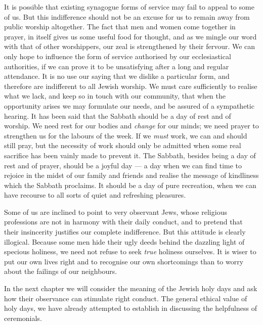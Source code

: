 It is possible that existing synagogue
forms of service may fail to appeal to some
of us. But this indifference should not be
an excuse for us to remain away from public
worship altogether. The fact that men
and women come together in prayer, in
itself gives us some useful food for
thought, and as we mingle our word with
that of other worshippers, our zeal is
strengthened by their fervour. We can
only hope to influence the form of service
authorised by our ecclesiastical authorities,
if we can prove it to be unsatisfying
after a long and regular attendance. It
is no use our saying that we dislike a
particular form, and therefore are indifferent
to all Jewish worship. We must care
sufficiently to realise what we lack, and
keep so in touch with our community,
that when the opportunity arises we may
formulate our needs, and be assured of
a sympathetic hearing. It has been said
that the Sabbath should be a day of rest
and of worship. We need rest for our
bodies and \textsl{change} for our minds; we need
prayer to strengthen us for the labours of
the week. If we \textsl{must} work, we can and
should still pray, but the necessity of work
should only be admitted when some real
sacrifice has been vainly made to prevent
it. The Sabbath, besides being a day of
rest and of prayer, should be a joyful day — 
a day when we can find time to rejoice in
the midst of our family and friends and
realise the message of kindliness which the
Sabbath proclaims. It should be a day of
pure recreation, when we can have
recourse to all sorts of quiet and refreshing
pleasures.

Some of us are inclined to point to very
observant Jews, whose religious professions
are not in harmony with their daily conduct,
and to pretend that their insincerity justifies
our complete indifference. But this attitude
is clearly illogical. Because some men hide
their ugly deeds behind the dazzling light
of specious holiness, we need not refuse to
seek \textsl{true} holiness ourselves. It is wiser
to put our own lives right and to recognise
our own shortcomings than to
worry about the failings of our neighbours.

In the next chapter we will consider the
meaning of the Jewish holy days and ask
how their observance can stimulate right
conduct. The general ethical value of
holy days, we have already attempted to
establish in discussing the helpfulness of
ceremonials.

